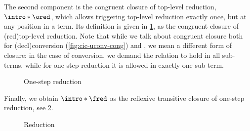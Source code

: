 \AP The second component is the congruent closure of top-level reduction,
 $\intro*\ored$, which allows triggering top-level reduction exactly once,
but at any position in a term. Its definition is given in \cref{fig:ccw-ored}, as
the congruent closure of \kl(red){top-level} reduction.
Note that while we talk about congruent closure both for
\kl(decl){conversion} (\cref{fig:cic-uconv-cong})
and , we mean a different form of closure:
in the case of conversion, we demand the relation to hold in all sub-terms,
while for one-step reduction it is allowed in exactly one sub-term.

\begin{figure}[ht]
  \ContinuedFloat
  \caption{One-step reduction}
  \label{fig:ccw-ored}
\end{figure}

\AP Finally, we obtain  $\intro*\fred$ as the reflexive
transitive closure of one-step reduction, see \cref{fig:red}.

\begin{figure}[ht]
  \ContinuedFloat
  \caption{Reduction}
  \label{fig:red}
\end{figure}

